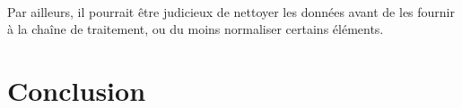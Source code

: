 \documentclass[a4paper,12pt]{article}
\begin{document}
\paragraph{}
Par ailleurs, il pourrait être judicieux de nettoyer les données avant de les fournir à la chaîne de traitement, ou du moins normaliser certains éléments.



\section*{Conclusion}


% 



\end{document}
